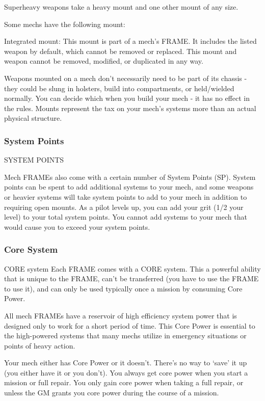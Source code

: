 Superheavy weapons take a heavy mount and one other mount of any size.


Some mechs have the following mount:


Integrated mount: This mount is part of a mech’s FRAME. It includes the listed weapon by
default, which cannot be removed or replaced. This mount and weapon cannot be removed,
modified, or duplicated in any way.


Weapons mounted on a mech don’t necessarily need to be part of its chassis - they could be
slung in holsters, build into compartments, or held/wielded normally. You can decide which when
you build your mech - it has no effect in the rules. Mounts represent the tax on your mech’s
systems more than an actual physical structure.


\subsubsection{System Points}
                                          SYSTEM POINTS


Mech FRAMEs also come with a certain number of System Points (SP). System points can be
spent to add additional systems to your mech, and some weapons or heavier systems will take
system points to add to your mech in addition to requiring open mounts. As a pilot levels up, you
can add your grit (1/2 your level) to your total system points. You cannot add systems to your
mech that would cause you to exceed your system points.

\subsubsection{Core System}
                                             CORE system
Each FRAME comes with a CORE system. This a powerful ability that is unique to the FRAME,
can’t be transferred (you have to use the FRAME to use it), and can only be used typically once a
mission by consuming Core Power.


All mech FRAMEs have a reservoir of high efficiency system power that is designed only to work
for a short period of time. This Core Power is essential to the high-powered systems that many
mechs utilize in emergency situations or points of heavy action.


Your mech either has Core Power or it doesn’t. There’s no way to ‘save’ it up (you either have it
or you don’t). You always get core power when you start a mission or full repair. You only gain
core power when taking a full repair, or unless the GM grants you core power during the course
of a mission.

